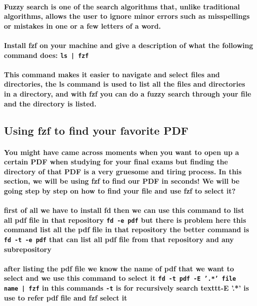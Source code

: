 \documentclass[12pt]{article}
\begin{document}
\paragraph{Fuzzy search is one of the search algorithms that, unlike traditional algorithms, allows the user to ignore minor errors such as misspellings or mistakes in one or a few letters of a word.}
\paragraph{Install fzf on your machine and give a description of what the following command does: \texttt{ls | fzf}}
\paragraph{This command makes it easier to navigate and select files and directories, the ls command is used to list all the files and directories in a directory, and with fzf you can do a fuzzy search through your file and the directory is listed.}
\subsection{Using fzf to find your favorite PDF}
\paragraph{You might have came across moments when you want to open up a certain PDF when studying for your final exams but finding the directory of that PDF is a very gruesome and tiring process. In this section, we will be using fzf to find our PDF in seconds! We will be going step by step on how to find your file and use fzf to select it?}
\paragraph{first of all we have to install fd then we can use this command to list all pdf file in that repository \texttt{fd -e pdf} but there is problem here this command list all the pdf file in that repository the better command is \texttt{fd -t -e pdf} that can list all pdf file from that repository and any subrepository }
\paragraph{after listing the pdf file we know the name of pdf that we want to select and we use this command to select it \texttt{fd -t pdf -E '.*' file name | fzf} in this commands \texttt{-t} is for  recursively search texttt{-E '.*'} is use to refer pdf file and fzf select it}
\end{document}
